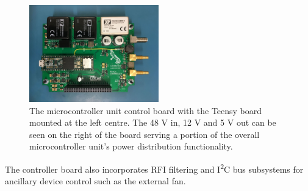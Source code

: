 \begin{figure}[t]
    \centering
    \includegraphics[width=0.5\textwidth]{control_board}
    \caption{The microcontroller unit control board with the Teensy board mounted at the left centre. The 48 V in, 12 V and 5 V out can be seen on the right of the board serving a portion of the overall microcontroller unit's power distribution functionality.}
    \label{fig:control_board}
\end{figure}
The controller board also incorporates RFI filtering and I\textsuperscript{2}C bus subsystems for ancillary device control such as the external fan.

